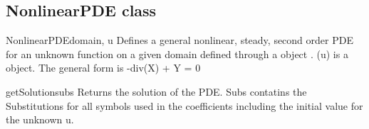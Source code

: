 \subsection{NonlinearPDE class}
\begin{classdesc}{NonlinearPDE}{domain, u}
Defines a general nonlinear, steady, second order PDE for an unknown function  on a given domain defined through a \Domain object . \var(u) is a \SYMBOL object.
The general form is -div(X) + Y = 0 
\end{classdesc}
\iffalse
\begin{methoddesc}[NonlinearPDE]{concatenateRow}{}
test
\end{methoddesc}
\begin{methoddesc}[NonlinearPDE]{createCoefficient}{}
test
\end{methoddesc}
\begin{methoddesc}[NonlinearPDE]{getUnknownSymbol}{}
test
\end{methoddesc}
\begin{methoddesc}[NonlinearPDE]{getLinearSolverOptions}{}
test
\end{methoddesc}
\begin{methoddesc}[NonlinearPDE]{getLinearPDE}{}
test
\end{methoddesc}
\begin{methoddesc}[NonlinearPDE]{getNumSolutions}{}
test
\end{methoddesc}
\begin{methoddesc}[NonlinearPDE]{getShapeOfCoefficient}{}
test
\end{methoddesc}
\begin{methoddesc}[NonlinearPDE]{getCoefficient}{}
test
\end{methoddesc}
\begin{methoddesc}[NonlinearPDE]{getSensitivity}{}
test
\end{methoddesc}
\fi
\begin{methoddesc}[NonlinearPDE]{getSolution}{subs}
Returns the solution of the PDE. Subs contatins the Substitutions for all symbols used in the coefficients including the initial value for the unknown u.
\end{methoddesc}
\pagebreak
